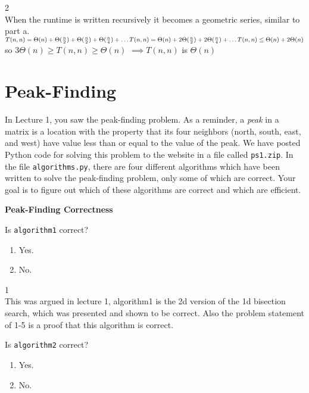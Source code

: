 \documentclass[12pt,twoside]{article}
\begin{document}
\begin{problems}
\begin{problemparts}
\ifsolution \solution{}
2
\\When the runtime is written recursively it becomes a geometric series, similar to part a.
\\$T(n,n) = \Theta(n) + \Theta(\frac{n}{2}) + \Theta(\frac{n}{2}) + \Theta(\frac{n}{4}) + \ldots
\\T(n,n) = \Theta(n) + 2\Theta(\frac{n}{2}) + 2\Theta(\frac{n}{4}) + \ldots
\\T(n,n) \leq \Theta(n) + 2\Theta(n)$
\\so  $3\Theta(n) \geq T(n,n) \geq \Theta(n)$
$\implies T(n,n)$ is $\Theta(n)$
\fi

\end{problemparts}

\section*{Peak-Finding}

In Lecture 1,
you saw the peak-finding problem.
As a reminder,
a \emph{peak} in a matrix
is a location with the property that its four neighbors
(north, south, east, and west)
have value less than or equal to the value of the peak.
We have posted Python code for solving this problem
to the website in a file called \texttt{ps1.zip}.
In the file \texttt{algorithms.py},
there are four different algorithms
which have been written
to solve the peak-finding problem,
only some of which are correct.
Your goal is to figure out
which of these algorithms are correct
and which are efficient.

\problem {} \textbf{Peak-Finding Correctness}

\begin{problemparts}

\problempart {} Is \texttt{algorithm1} correct?
\begin{enumerate}
\item Yes.
\item No.
\end{enumerate}

\ifsolution \solution{}
1
\\This was argued in lecture 1, algorithm1 is the 2d version of the 1d bisection search, which was presented and shown to be correct.  Also the problem statement of 1-5 is a proof that this algorithm is correct.
\fi

\problempart {} Is \texttt{algorithm2} correct?
\begin{enumerate}
\item Yes.
\item No.
\end{enumerate}


\end{problemparts}
\end{problems}
\end{document}
